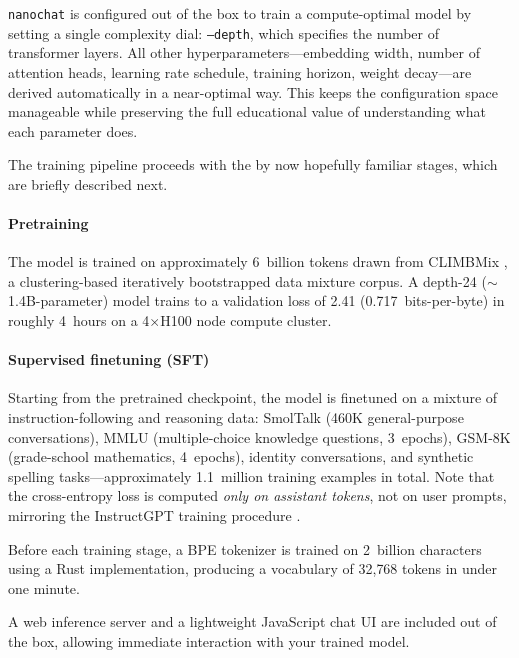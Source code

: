 \texttt{nanochat} is configured out of the box to train a compute-optimal model by setting a single complexity dial: \texttt{--depth}, which specifies the number of transformer layers. All other hyperparameters---embedding width, number of attention heads, learning rate schedule, training horizon, weight decay---are derived automatically in a near-optimal way. This keeps the configuration space manageable while preserving the full educational value of understanding what each parameter does.

The training pipeline proceeds with the by now hopefully familiar stages, which are briefly described next.

\paragraph{Pretraining}  The model is trained on approximately 6~billion tokens drawn from CLIMBMix \citep{diao2026nemotron}, a clustering-based iteratively bootstrapped data mixture corpus.  A depth-24 ($\sim $1.4B-parameter) model trains to a validation loss of 2.41 (0.717~bits-per-byte) in roughly 4~hours on a 4$\times$H100 node compute cluster.

\paragraph{Supervised finetuning (SFT)}  Starting from the pretrained checkpoint, the model is finetuned on a mixture of instruction-following and reasoning data: SmolTalk \citep{benallal2024smoltalk} (460K general-purpose conversations), MMLU (multiple-choice knowledge questions, 3~epochs), GSM-8K (grade-school mathematics, 4~epochs), identity conversations, and synthetic spelling tasks---approximately 1.1~million training examples in total. Note that  the cross-entropy loss is computed \emph{only on assistant tokens}, not on user prompts, mirroring the InstructGPT training procedure \citep{ouyang2022training}.

Before each training stage, a BPE tokenizer is trained on 2~billion characters using a Rust implementation, producing a vocabulary of 32{,}768 tokens in under one minute.

A web inference server and a lightweight JavaScript chat UI are included out of the box, allowing immediate interaction with your trained model.

